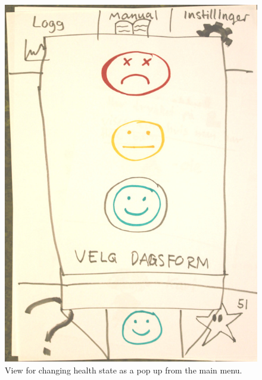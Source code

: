\begin{figure}
	\begin{minipage}[b]{0.46\linewidth}
		\centering
			\includegraphics[width=0.34\paperwidth]{Pictures/DesignWorkshop/HealthStateViewPopup}
		\caption[Change health state as pop up from design workshop]{View for changing health state as a pop up from the main menu.}
		\label{fig:dwHealthStatePopup}
	\end{minipage}
	\hspace{1cm}
	\begin{minipage}[b]{0.46\linewidth}
		\centering

\end{minipage}
\end{figure}
